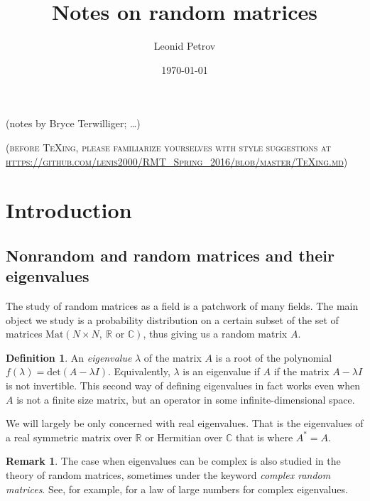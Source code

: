 \documentclass[letterpaper,11pt,oneside,reqno]{amsart}
\numberwithin{equation}{section}
\newcommand{\note}[1]{\textsc{\color{blue}(#1)}}
\theoremstyle{definition}
\newtheorem{definition}[proposition]{Definition}
\newtheorem{remark}[proposition]{Remark}
\begin{document}
\title[Notes on random matrices]{Notes on random matrices}

\author[L. Petrov]{Leonid Petrov}
\date{\today}
\maketitle

\begin{center}
	(notes by Bryce Terwilliger; \ldots)
\end{center}

\note{before \TeX{}ing, please familiarize yourselves with style suggestions at 
\url{https://github.com/lenis2000/RMT_Spring_2016/blob/master/TeXing.md}}

\tableofcontents
\setcounter{tocdepth}{3}

\section{Introduction} %
\label{sec:introduction}

\subsection{Nonrandom and random matrices and their eigenvalues} %
\label{sub:object_of_study}

The study of random matrices as a field is a patchwork of many fields.  The
main object we study is a probability distribution on a certain subset of the
set of matrices $\mathrm{Mat}(N\times N,\ \mathbb R \text{ or } \mathbb C)$,
thus giving us a random matrix $A$.

\begin{definition}
An {\it eigenvalue} $\lambda$ of the matrix $A$ is a root of the polynomial
$f(\lambda)=\text{det}(A-\lambda I)$.  Equivalently, $\lambda$ is an
eigenvalue if $A$ if the matrix $A-\lambda I$ is not invertible. This second
way of defining eigenvalues in fact works even when $A$ is not a finite
size matrix, but an operator in some infinite-dimensional space.
\end{definition}

We will largely be only concerned with real eigenvalues.  That is the
eigenvalues of a real symmetric matrix over $\mathbb R$ or Hermitian over
$\mathbb C$ that is where $A^*=A$.

\begin{remark}
	The case when eigenvalues can be complex is also studied in
	the theory of random matrices, sometimes under the keyword \emph{complex
	random matrices}. See, for example, \cite{gotze2010circular} for a law of 
	large numbers for complex eigenvalues.
\end{remark}
\end{document}
